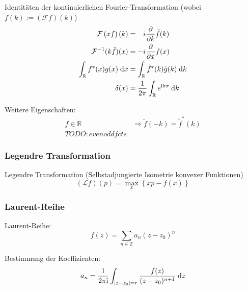 			\noindent
			Identitäten der kontinuierlichen Fourier-Transformation (wobei $\tilde{f}(k) := \left(\mathcal{F}f\right)(k)$)
			\begin{equation}
				\begin{aligned}
					\mathcal{F}\left(xf\right)(k) &= \phantom{-}i \frac{\partial }{\partial k}\tilde{f}(k) \\
					\mathcal{F}^{-1}(k\tilde{f})(x) &= -i\frac{\partial }{\partial x}f(x) \\
					\int_{\mathbb{R}} f^{*}(x) g(x)\;\mathrm{d} x &=
					\int_{\mathbb{R}}\tilde{f}^{*}(k)\tilde{g}(k)\;\mathrm{d} k \\
					\delta(x) &= \frac{1}{2\pi}\int_{\mathbb{R}}e^{\mathrm{i} kx}\;\mathrm{d} k \\
					\label{eq:fourierIdentities}
				\end{aligned}
			\end{equation}

			\noindent
			Weitere Eigenschaften:
			\begin{equation}
				\begin{aligned}
					f\in\mathbb{R}
					&\Rightarrow \tilde{f}(-k)=\tilde{f}^*(k) \\
					TODO: even odd fcts
				\end{aligned}
			\end{equation}

		\subsubsection{Legendre Transformation}
			\noindent
			Legendre Transformation (Selbstadjungierte Isometrie konvexer Funktionen)
			\begin{equation}
				(\mathcal{L}f)(p)=\max_x\left\lbrace xp-f(x) \right\rbrace
			\end{equation}


		\subsubsection{Laurent-Reihe}
			\noindent
			Laurent-Reihe:
			\begin{equation}
				f(z)=\sum_{n\in\mathbb{Z}} a_n(z-z_0)^n
			\end{equation}

			\noindent
			Bestimmung der Koeffizienten:
			\begin{equation}
				a_n = \frac{1}{2 \pi \mathrm{i}}\int_{\left| z-z_0 \right| = r} \frac{f(z)}{(z-z_0)^{n+1}}\;\mathrm{d} z
			\end{equation}

